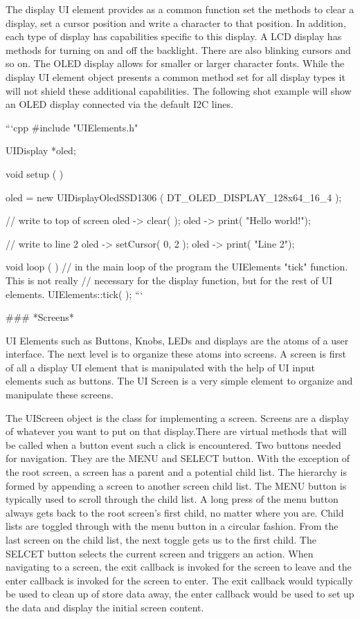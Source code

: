 The display UI element provides as a common function set the methods to clear a display, set a cursor position and write a character to that position. In addition, each type of display has capabilities specific to this display. A LCD display has methods for turning on and off the backlight. There are also blinking cursors and so on. The OLED display allows for smaller or larger character fonts. While the display UI element object presents a common method set for all display types it will not shield these additional capabilities. The following shot example will show an OLED display connected via the default I2C lines.

```cpp
#include "UIElements.h"

UIDisplay *oled;

void setup ( ) {

	oled = new UIDisplayOledSSD1306 ( DT_OLED_DISPLAY_128x64_16_4 );

	// write to top of screen
	oled -> clear( );
	oled -> print( "Hello world!");

	// write to line 2
	oled -> setCursor( 0, 2 );
	oled -> print( "Line 2");
}

void loop ( ) {
	// in the main loop of the program the UIElements "tick" function. This is not really
	// necessary for the display function, but for the rest of UI elements.
	UIElements::tick( );
}
```

### *Screens*

UI Elements such as Buttons, Knobs, LEDs and displays are the atoms of a user interface. The next level is to organize these atoms into screens. A screen is first of all a display UI element that is manipulated with the help of UI input elements such as buttons. The UI Screen is a very simple element to organize and manipulate these screens.

The UIScreen object is the class for implementing a screen. Screens are a display of whatever you want to put on that display.There are virtual methods that will be called when a button event such a click is encountered. Two buttons needed for navigation. They are the MENU and SELECT button. With the exception of the root screen, a screen has a parent and a potential child list. The hierarchy is formed by appending a screen to another screen child list. The MENU button is typically used to scroll through the child list. A long press of the menu button always gets back to the root screen's first child, no matter where you are. Child lists are toggled through with the menu button in a circular fashion. From the last screen on the child list, the next toggle gets us to the first child. The SELCET button selects the current screen and triggers an action. When navigating to a screen, the exit callback is invoked for the screen to leave and the enter callback is invoked for the screen to enter. The exit callback would typically be used to clean up of store data away, the enter callback would be used to set up the data and display the initial screen content.

